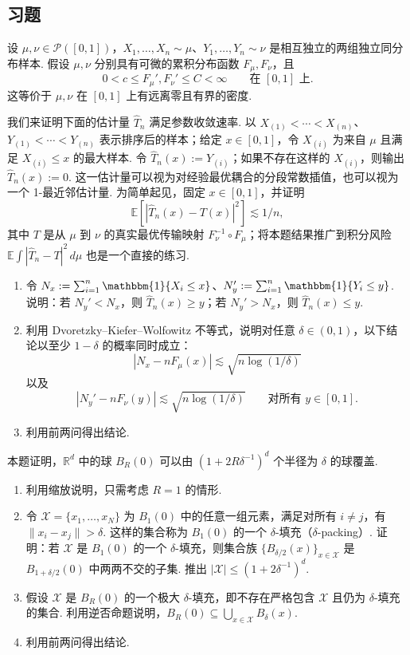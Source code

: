 \subsection{习题}\label{sec:3.8}
\begin{exercise}\label{exer:3.1}
设 $\mu,\nu\in\mathcal P([0,1])$，$X_1,\ldots,X_n\sim\mu$、$Y_1,\ldots,Y_n\sim\nu$ 是相互独立的两组独立同分布样本. 假设 $\mu,\nu$ 分别具有可微的累积分布函数 $F_\mu,F_\nu$，且
$$0<c\le F_\mu',F_\nu'\le C<\infty\qquad\text{在 }[0,1]\text{ 上}.$$
这等价于 $\mu,\nu$ 在 $[0,1]$ 上有远离零且有界的密度.

我们来证明下面的估计量 $\widehat T_n$ 满足参数收敛速率. 以 $X_{(1)}<\cdots<X_{(n)}$、$Y_{(1)}<\cdots<Y_{(n)}$ 表示排序后的样本；给定 $x\in[0,1]$，令 $X_{(i)}$ 为来自 $\mu$ 且满足 $X_{(i)}\le x$ 的最大样本. 令 $\widehat T_n(x):=Y_{(i)}$；如果不存在这样的 $X_{(i)}$，则输出 $\widehat T_n(x):=0$. 这一估计量可以视为对经验最优耦合的分段常数插值，也可以视为一个 1-最近邻估计量. 为简单起见，固定 $x\in[0,1]$，并证明
$$\mathbb E[|\widehat T_n(x)-T(x)|^2]\lesssim1/n,$$
其中 $T$ 是从 $\mu$ 到 $\nu$ 的真实最优传输映射 $F_\nu^{-1}\circ F_\mu$；将本题结果推广到积分风险 $\mathbb E\int|\widehat T_n-T|^2\,d\mu$ 也是一个直接的练习.
\begin{enumerate}\renewcommand{\labelenumi}{(\alph{enumi})}
\item 令 $N_x:=\sum_{i=1}^n\mathbbm{1}\{X_i\le x\}$、$N_y':=\sum_{i=1}^n\mathbbm{1}\{Y_i\le y\}$. 说明：若 $N_y'<N_x$，则 $\widehat T_n(x)\ge y$；若 $N_y'>N_x$，则 $\widehat T_n(x)\le y$.
\item 利用 Dvoretzky--Kiefer--Wolfowitz 不等式，说明对任意 $\delta\in(0,1)$，以下结论以至少 $1-\delta$ 的概率同时成立：
$$|N_x-nF_\mu(x)|\lesssim\sqrt{n\log(1/\delta)}$$
以及
$$|N_y'-nF_\nu(y)|\lesssim\sqrt{n\log(1/\delta)}\qquad\text{对所有 }y\in[0,1].$$
\item 利用前两问得出结论.
\end{enumerate}
\end{exercise}

\begin{exercise}\label{exer:3.2}
本题证明，$\mathbb R^d$ 中的球 $B_R(0)$ 可以由 $(1+2R\delta^{-1})^d$ 个半径为 $\delta$ 的球覆盖.
\begin{enumerate}\renewcommand{\labelenumi}{(\alph{enumi})}
\item 利用缩放说明，只需考虑 $R=1$ 的情形.
\item 令 $\mathcal X=\{x_1,\ldots,x_N\}$ 为 $B_1(0)$ 中的任意一组元素，满足对所有 $i\ne j$，有 $\|x_i-x_j\|>\delta$. 这样的集合称为 $B_1(0)$ 的一个 $\delta$-填充（$\delta$-packing）. 证明：若 $\mathcal X$ 是 $B_1(0)$ 的一个 $\delta$-填充，则集合族 $\{B_{\delta/2}(x)\}_{x\in\mathcal X}$ 是 $B_{1+\delta/2}(0)$ 中两两不交的子集. 推出 $|\mathcal X|\le(1+2\delta^{-1})^d$.
\item 假设 $\mathcal X$ 是 $B_R(0)$ 的一个极大 $\delta$-填充，即不存在严格包含 $\mathcal X$ 且仍为 $\delta$-填充的集合. 利用逆否命题说明，$B_R(0)\subseteq\bigcup_{x\in\mathcal X}B_\delta(x)$.
\item 利用前两问得出结论.
\end{enumerate}
\end{exercise}

